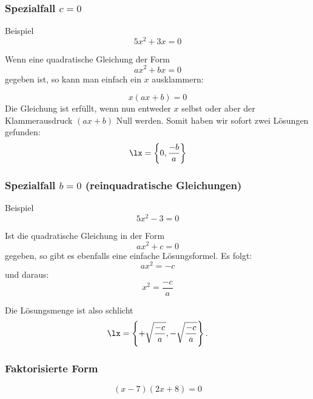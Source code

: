 
\subsubsection{Spezialfall $c=0$}

Beispiel
$$5x^2 + 3x = 0$$



Wenn eine quadratische Gleichung der Form
$$ax^2 +bx = 0$$
gegeben ist, so kann man einfach ein $x$ ausklammern:

$$x(ax+b)=0$$
 Die Gleichung ist erfüllt, wenn nun entweder $x$ selbst oder aber
 der Klammerausdruck $(ax+b)$ Null werden. Somit haben wir sofort zwei
 Lösungen gefunden:
 $$\lx=\left\{0, \frac{-b}{a}\right\}$$

 \newpage

 
 \subsubsection{Spezialfall $b=0$ (reinquadratische Gleichungen)}

Beispiel
$$5x^2 - 3 = 0$$





Ist die quadratische Gleichung in der Form
 $$ax^2 + c = 0$$
 gegeben, so gibt es ebenfalls eine einfache Lösungsformel. Es folgt:
 $$ax^2 = -c$$
 und daraus:
 $$x^2 = \frac{-c}{a}$$

 Die Lösungsmenge ist also schlicht
 $$\lx=\left\{ + \sqrt{\frac{-c}{a}}, -\sqrt{\frac{-c}{a}} \right\}.$$



\newpage

\subsubsection{Faktorisierte Form}

$$(x-7)(2x+8) = 0$$


\newpage
